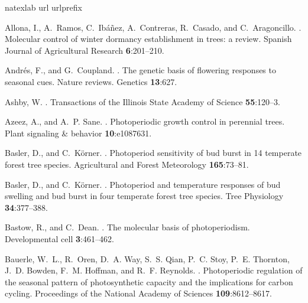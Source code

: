 \documentclass{article}
\begin{document}
\begin{thebibliography}{131}
\expandafter\ifx\csname natexlab\endcsname\relax\def\natexlab#1{#1}\fi
\expandafter\ifx\csname url\endcsname\relax
  \def\url#1{{\tt #1}}\fi
\expandafter\ifx\csname urlprefix\endcsname\relax\def\urlprefix{URL }\fi

Allona, I., A.~Ramos, C.~Ib{\'a}{\~n}ez, A.~Contreras, R.~Casado, and
  C.~Aragoncillo.
.
\newblock Molecular control of winter dormancy establishment in trees: a
  review.
\newblock Spanish Journal of Agricultural Research {\bf 6}:201--210.

Andr{\'e}s, F., and G.~Coupland.
.
\newblock The genetic basis of flowering responses to seasonal cues.
\newblock Nature reviews. Genetics {\bf 13}:627.

Ashby, W.
.
\newblock Transactions of the Illinois State Academy of Science {\bf
  55}:120--3.

Azeez, A., and A.~P. Sane.
.
\newblock Photoperiodic growth control in perennial trees.
\newblock Plant signaling \& behavior {\bf 10}:e1087631.

Basler, D., and C.~K{\"o}rner.
.
\newblock Photoperiod sensitivity of bud burst in 14 temperate forest tree
  species.
\newblock Agricultural and Forest Meteorology {\bf 165}:73--81.

Basler, D., and C.~K{\"o}rner.
.
\newblock Photoperiod and temperature responses of bud swelling and bud burst
  in four temperate forest tree species.
\newblock Tree Physiology {\bf 34}:377--388.

Bastow, R., and C.~Dean.
.
\newblock The molecular basis of photoperiodism.
\newblock Developmental cell {\bf 3}:461--462.

Bauerle, W.~L., R.~Oren, D.~A. Way, S.~S. Qian, P.~C. Stoy, P.~E. Thornton,
  J.~D. Bowden, F.~M. Hoffman, and R.~F. Reynolds.
.
\newblock Photoperiodic regulation of the seasonal pattern of photosynthetic
  capacity and the implications for carbon cycling.
\newblock Proceedings of the National Academy of Sciences {\bf 109}:8612--8617.


\end{thebibliography}
\end{document}
